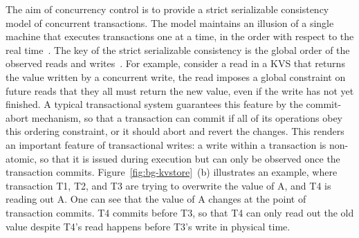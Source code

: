 The aim of concurrency control is to provide a strict serializable consistency model of concurrent transactions. The model maintains an illusion of a single machine that executes transactions one at a time, in the order with respect to the real time~\cite{farm, drtm, compromise, timestone_asplos20, calvin_sigmod12, cicadia_sigmod17, tm_book, rss_sosp21, hekaton_sigmod13}. The key of the strict serializable consistency is the global order of the observed reads and writes~\cite{rss_sosp21, acid_79}. For example, consider a read in a KVS that returns the value written by a concurrent write, the read imposes a global constraint on future reads that they all must return the new value, even if the write has not yet finished. 
A typical transactional system guarantees this feature by the commit-abort mechanism, so that a transaction can commit if all of its operations obey this ordering constraint, or it should abort and revert the changes. 
This renders an important feature of transactional writes: a write within a transaction is non-atomic, so that it is issued during execution but can only be observed once the transaction commits. 
Figure~\ref{fig:bg-kvstore}~(b) illustrates an example, where transaction T1, T2, and T3 are trying to overwrite the value of A, and T4 is reading out A. 
One can see that the value of A changes at the point of transaction commits. 
T4 commits before T3, so that T4 can only read out the old value despite T4's read happens before T3's write in physical time. 

